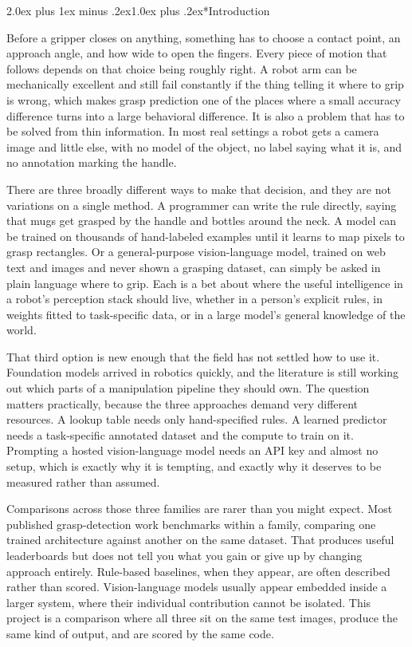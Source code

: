 \documentclass[12pt,letterpaper]{article}
\makeatletter
\renewcommand{\section}{\@startsection{section}{1}{0pt}%
  {2.0ex plus 1ex minus .2ex}{1.0ex plus .2ex}{\normalsize\bfseries}}
\makeatother
\begin{document}
\section*{Introduction}

Before a gripper closes on anything, something has to choose a contact
point, an approach angle, and how wide to open the fingers. Every piece
of motion that follows depends on that choice being roughly right. A
robot arm can be mechanically excellent and still fail constantly if
the thing telling it where to grip is wrong, which makes grasp
prediction one of the places where a small accuracy difference turns
into a large behavioral difference. It is also a problem that has to be
solved from thin information. In most real settings a robot gets a
camera image and little else, with no model of the object, no label
saying what it is, and no annotation marking the handle.

There are three broadly different ways to make that decision, and they
are not variations on a single method. A programmer can write the rule
directly, saying that mugs get grasped by the handle and bottles around
the neck. A model can be trained on thousands of hand-labeled examples
until it learns to map pixels to grasp rectangles. Or a general-purpose
vision-language model, trained on web text and images and never shown a
grasping dataset, can simply be asked in plain language where to grip.
Each is a bet about where the useful intelligence in a robot's
perception stack should live, whether in a person's explicit rules, in
weights fitted to task-specific data, or in a large model's general
knowledge of the world.

That third option is new enough that the field has not settled how to
use it. Foundation models arrived in robotics quickly, and the
literature is still working out which parts of a manipulation pipeline
they should own. The question matters practically, because the three
approaches demand very different resources. A lookup table needs only
hand-specified rules. A learned predictor needs a task-specific
annotated dataset and the compute to train on it. Prompting a hosted
vision-language model needs an API key and almost no setup, which is
exactly why it is tempting, and exactly why it deserves to be measured
rather than assumed.

Comparisons across those three families are rarer than you might
expect. Most published grasp-detection work benchmarks within a family,
comparing one trained architecture against another on the same dataset.
That produces useful leaderboards but does not tell you what you gain
or give up by changing approach entirely. Rule-based baselines, when
they appear, are often described rather than scored. Vision-language
models usually appear embedded inside a larger system, where their
individual contribution cannot be isolated. This project is a
comparison where all three sit on the same test images, produce the
same kind of output, and are scored by the same code.
\end{document}
